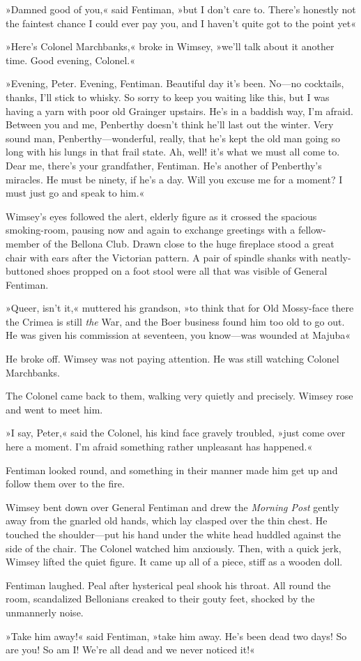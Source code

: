 »Damned good of you,« said Fentiman, »but I don't care to. There's honestly not the faintest chance I could ever pay you, and I haven't quite got to the point yet\longdash«

»Here's Colonel Marchbanks,« broke in Wimsey, »we'll talk about it another time. Good evening, Colonel.«

»Evening, Peter. Evening, Fentiman. Beautiful day it's been. No—no cocktails, thanks, I'll stick to whisky. So sorry to keep you waiting like this, but I was having a yarn with poor old Grainger upstairs. He's in a baddish way, I'm afraid. Between you and me, Penberthy doesn't think he'll last out the winter. Very sound man, Penberthy—wonderful, really, that he's kept the old man going so long with his lungs in that frail state. Ah, well! it's what we must all come to. Dear me, there's your grandfather, Fentiman. He's another of Penberthy's miracles. He must be ninety, if he's a day. Will you excuse me for a moment? I must just go and speak to him.«

Wimsey's eyes followed the alert, elderly figure as it crossed the spacious smoking-room, pausing now and again to exchange greetings with a fellow-member of the Bellona Club. Drawn close to the huge fireplace stood a great chair with ears after the Victorian pattern. A pair of spindle shanks with neatly-buttoned shoes propped on a foot stool were all that was visible of General Fentiman.

»Queer, isn't it,« muttered his grandson, »to think that for Old Mossy-face there the Crimea is still \textit{the} War, and the Boer business found him too old to go out. He was given his commission at seventeen, you know—was wounded at Majuba\longdash«

He broke off. Wimsey was not paying attention. He was still watching Colonel Marchbanks.

The Colonel came back to them, walking very quietly and precisely. Wimsey rose and went to meet him.

»I say, Peter,« said the Colonel, his kind face gravely troubled, »just come over here a moment. I'm afraid something rather unpleasant has happened.«

Fentiman looked round, and something in their manner made him get up and follow them over to the fire.

Wimsey bent down over General Fentiman and drew the \textit{Morning Post} gently away from the gnarled old hands, which lay clasped over the thin chest. He touched the shoulder—put his hand under the white head huddled against the side of the chair. The Colonel watched him anxiously. Then, with a quick jerk, Wimsey lifted the quiet figure. It came up all of a piece, stiff as a wooden doll.

Fentiman laughed. Peal after hysterical peal shook his throat. All round the room, scandalized Bellonians creaked to their gouty feet, shocked by the unmannerly noise.

»Take him away!« said Fentiman, »take him away. He's been dead two days! So are you! So am I\@! We're all dead and we never noticed it!«